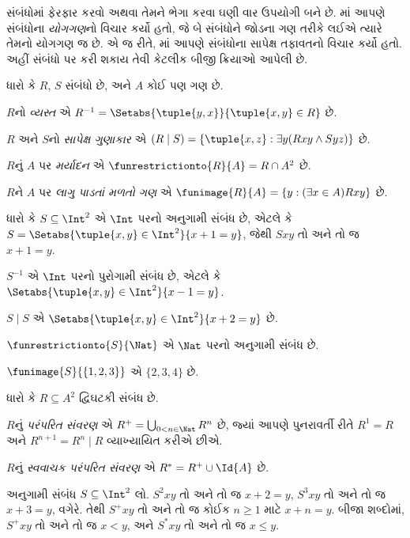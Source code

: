 \label{guunit:OLP-0019}


સંબંધોમાં ફેરફાર કરવો અથવા તેમને ભેગા કરવા ઘણી વાર ઉપયોગી
બને છે. માં આપણે
સંબંધોના \emph{યોગગણ}નો વિચાર કર્યો હતો, જે બે સંબંધોને
જોડના ગણ તરીકે લઈએ ત્યારે તેમનો યોગગણ જ છે.
એ જ રીતે, માં
આપણે સંબંધોના સાપેક્ષ તફાવતનો વિચાર કર્યો હતો.
અહીં સંબંધો પર કરી શકાય તેવી કેટલીક બીજી ક્રિયાઓ આપેલી છે.

\begin{defn}
ધારો કે $R$, $S$ સંબંધો છે, અને $A$ કોઈ પણ ગણ છે.

$R$નો \emph{વ્યસ્ત} એ
$R^{-1} = \Setabs{\tuple{y, x}}{\tuple{x, y} \in R}$ છે.

$R$ અને $S$નો \emph{સાપેક્ષ ગુણાકાર} એ
$(R \mid S) = \{\tuple{x, z} : \exists y(Rxy \land Syz)\}$ છે.

$R$નું $A$ પર \emph{મર્યાદન} એ
$\funrestrictionto{R}{A}= R \cap A^2$ છે.

$R$ને $A$ પર \emph{લાગુ પાડતાં મળતો ગણ} એ
$\funimage{R}{A} = \{y : (\exists x \in A)Rxy\}$ છે.
\end{defn}

\begin{ex}
ધારો કે $S \subseteq \Int^2$ એ $\Int$ પરનો અનુગામી સંબંધ છે,
એટલે કે $S = \Setabs{\tuple{x, y} \in \Int^2}{x + 1 = y}$,
જેથી $Sxy$ તો અને તો જ $x + 1 = y$.

$S^{-1}$ એ $\Int$ પરનો પુરોગામી સંબંધ છે,
એટલે કે $\Setabs{\tuple{x,y}\in\Int^2}{x -1 =y}$.

$S\mid S$ એ
$ \Setabs{\tuple{x,y}\in\Int^2}{x + 2 =y}$ છે.

$\funrestrictionto{S}{\Nat}$ એ $\Nat$ પરનો અનુગામી સંબંધ છે.

$\funimage{S}{\{1,2,3\}}$ એ $\{2, 3, 4\}$ છે.
\end{ex}

\begin{defn}[પરંપરિત સંવરણ]ધારો કે $R \subseteq A^2$ દ્વિઘટકી સંબંધ છે.

$R$નું \emph{પરંપરિત સંવરણ} એ
$R^+ = \bigcup_{0 < n \in \Nat} R^n$ છે,
જ્યાં આપણે પુનરાવર્તી રીતે $R^1 = R$ અને
$R^{n+1} = R^n \mid R$ વ્યાખ્યાયિત કરીએ છીએ.

$R$નું \emph{સ્વવાચક પરંપરિત સંવરણ} એ
$R^* = R^+ \cup \Id{A}$ છે.
\end{defn}

\begin{ex}
અનુગામી સંબંધ $S \subseteq \Int^2$ લો.
$S^2xy$ તો અને તો જ $x + 2 = y$,
$S^3xy$ તો અને તો જ $x + 3 = y$, વગેરે.
તેથી $S^+xy$ તો અને તો જ કોઈક $n \geq 1$ માટે
$x + n = y$. બીજા શબ્દોમાં, $S^+xy$ તો અને તો જ $x < y$,
અને $S^*xy$ તો અને તો જ $x \le y$.
\end{ex}

